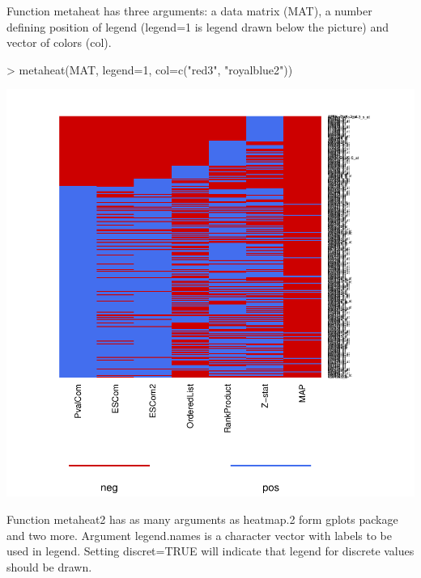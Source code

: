 \documentclass[a4paper]{report}
\begin{document}
Function {\ttfamily metaheat} has three arguments: a data matrix ({\ttfamily MAT}), a number defining position of legend ({\ttfamily legend=1} is legend drawn below the picture) and vector of colors ({\ttfamily col}). 
\begin{center}
\begin{Schunk}
\begin{Sinput}
> metaheat(MAT, legend=1, col=c("red3", "royalblue2"))
\end{Sinput}
\end{Schunk}
\includegraphics{MAMA-018}
\end{center}                  
 Function {\ttfamily metaheat2} has as many arguments as {\ttfamily heatmap.2} form gplots package and two more. Argument {\ttfamily legend.names} is a character vector with labels to be used in legend. Setting {\ttfamily discret=TRUE} will indicate that legend for discrete values should be drawn. 
\end{document}
